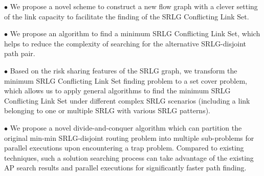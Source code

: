 
$\bullet$ We propose a novel scheme to construct a new flow graph with a clever setting of the link capacity to facilitate the finding of the SRLG Conflicting Link Set.

$\bullet$ We propose an algorithm to find a  minimum SRLG Conflicting Link Set, which helps to reduce the complexity of searching for the alternative SRLG-disjoint path pair.

$\bullet$ Based on the risk sharing features of the SRLG graph, we transform the minimum SRLG Conflicting Link Set finding problem to a set cover problem, which allows us to apply general algorithms to find the minimum SRLG Conflicting Link Set under different complex SRLG scenarios (including a link belonging to one or multiple SRLG with various SRLG patterns).

$\bullet$ We propose a novel divide-and-conquer algorithm which can partition the original min-min SRLG-disjoint routing problem into multiple sub-problems for parallel executions upon encountering a trap problem.  Compared to existing techniques, such a solution searching process can take advantage of the existing AP search results and parallel executions for significantly faster path finding.

